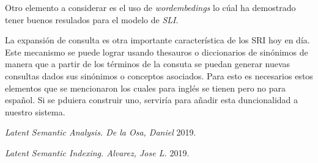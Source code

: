 \documentclass{llncs}
\begin{document}
  Otro elemento a considerar es el uso de \emph{wordembedings} lo cúal ha demostrado tener buenos resulados para el modelo de \emph{SLI}.
  
  La expansión de consulta es otra importante característica de los SRI hoy en día. Este mecanismo se puede lograr usando thesauros o diccionarios de sinónimos de manera que a partir de los términos de la consuta se puedan generar nuevas consultas dados sus sinónimos o conceptos asociados. Para esto es necesarios estos elementos que se mencionaron los cuales para inglés se tienen pero no para español. Si se pduiera construir uno, serviría para añadir esta duncionalidad a nuestro sistema.

\begin{thebibliography}{1}
  
   \emph{Latent Semantic Analysis. De la Osa, Daniel} 2019.

   \emph{Latent Semantic Indexing. Alvarez, Jose L.} 2019.

\end{thebibliography}
\end{document}
